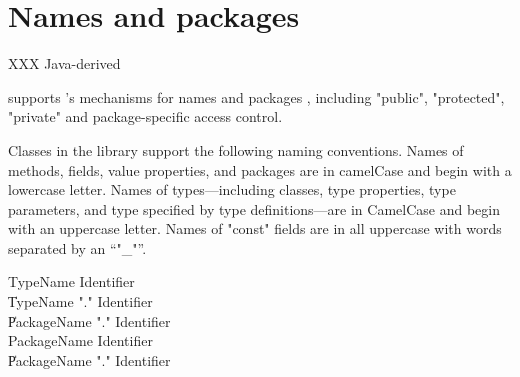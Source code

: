 \chapter{Names and packages}
\label{packages} 

XXX Java-derived

\Xten{} supports \java's mechanisms for names and packages \cite[\S
6,\S 7]{jls2}, including \xcd"public", \xcd"protected", \xcd"private"
and package-specific access control. 

Classes in the \Xten{} library support the following naming conventions.
Names of methods, fields, value properties, and packages are in camelCase and begin with a lowercase letter.
Names of types---including classes, type properties, type
parameters, and type specified by type definitions---are in CamelCase and begin with an uppercase letter.
Names of \xcd"const" fields are in all uppercase with words
separated by an ``\xcd"_"''.

\begin{grammar}
TypeName   \: Identifier \\
        \| TypeName \xcd"." Identifier \\
        \| PackageName \xcd"." Identifier \\
PackageName   \: Identifier \\
        \| PackageName \xcd"." Identifier \\
\end{grammar}

